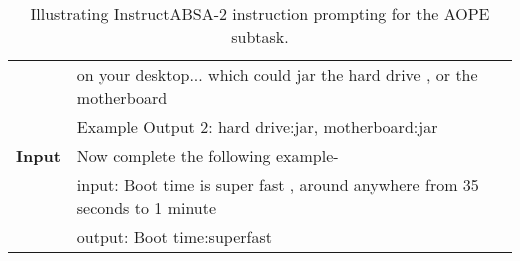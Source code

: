\documentclass[11pt]{article}
\newcommand{\name}{\textsc{I}nstruct\textsc{ABSA}\xspace}
\begin{document}
\begin{table*}[]
{\begin{tabular}{ll}
\textbf{}           &  on your desktop... which could jar the hard drive , or the motherboard     \\ 
\textbf{}           & Example Output 2: hard drive:jar, motherboard:jar                    \\ 
\hline 
\textbf{Input}      & Now complete the following example-                                \\
\textbf{}           & input: Boot time is super fast , around anywhere from 35 seconds to 1 minute \\
                    & output: Boot time:superfast\\ \hline
\end{tabular}
}
\caption{
     Illustrating \name{}-2 instruction prompting for the AOPE subtask.}
\label{tab:aope_ip}
\end{table*} 
\end{document}
